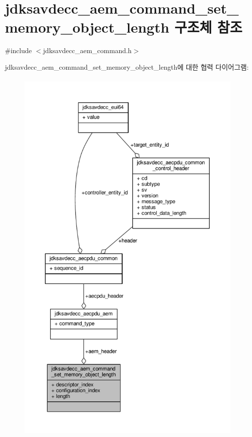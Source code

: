 \hypertarget{structjdksavdecc__aem__command__set__memory__object__length}{}\section{jdksavdecc\+\_\+aem\+\_\+command\+\_\+set\+\_\+memory\+\_\+object\+\_\+length 구조체 참조}
\label{structjdksavdecc__aem__command__set__memory__object__length}


{\ttfamily \#include $<$jdksavdecc\+\_\+aem\+\_\+command.\+h$>$}



jdksavdecc\+\_\+aem\+\_\+command\+\_\+set\+\_\+memory\+\_\+object\+\_\+length에 대한 협력 다이어그램\+:
\nopagebreak
\begin{figure}[H]
\begin{center}
\leavevmode
\includegraphics[height=550pt]{structjdksavdecc__aem__command__set__memory__object__length__coll__graph}
\end{center}
\end{figure}

